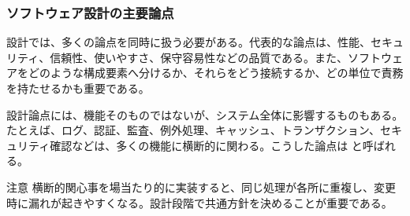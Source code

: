 \subsubsection{ソフトウェア設計の主要論点}

設計では、多くの論点を同時に扱う必要がある。代表的な論点は、性能、セキュリティ、信頼性、使いやすさ、保守容易性などの品質である。また、ソフトウェアをどのような構成要素へ分けるか、それらをどう接続するか、どの単位で責務を持たせるかも重要である。

設計論点には、機能そのものではないが、システム全体に影響するものもある。たとえば、ログ、認証、監査、例外処理、キャッシュ、トランザクション、セキュリティ確認などは、多くの機能に横断的に関わる。こうした論点は と呼ばれる。

\begin{pointbox}{注意}
横断的関心事を場当たり的に実装すると、同じ処理が各所に重複し、変更時に漏れが起きやすくなる。設計段階で共通方針を決めることが重要である。
\end{pointbox}
